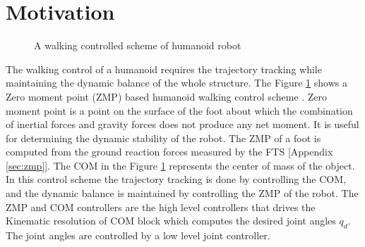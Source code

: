 \section{Motivation}
\begin{figure}
	\centering
	
	\vspace{0.5cm}
	\caption{A walking controlled scheme of humanoid robot}
	\label{fig:walk_ctrl}
\end{figure}
The walking control of a humanoid requires the trajectory tracking while maintaining the dynamic balance of the whole structure. The Figure \ref{fig:walk_ctrl} shows a Zero moment point (ZMP) based humanoid walking control scheme \citep{choi07}. Zero moment point is a point on the surface of the foot about which the combination of inertial forces and gravity forces does not produce any net moment. It is useful for determining the dynamic stability of the robot. The ZMP of a foot is computed from the ground reaction forces measured by the FTS [Appendix \ref{sec:zmp}]. The COM in the Figure \ref{fig:walk_ctrl} represents the center of mass of the object. In this control scheme the trajectory tracking is done by controlling the COM, and the dynamic balance is maintained by controlling the ZMP of the robot. The ZMP and COM controllers are the high level controllers that drives the Kinematic resolution of COM block which computes the desired joint angles $q_d$. The joint angles are controlled by a low level joint controller.

